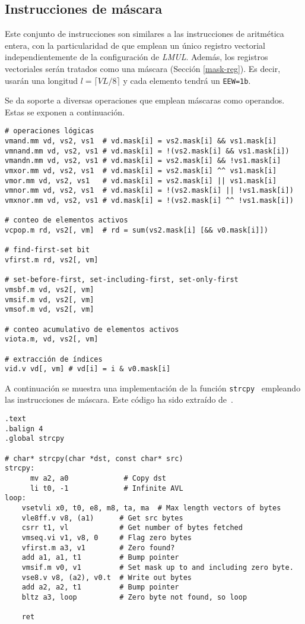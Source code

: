 \subsection{Instrucciones de máscara}{\label{sec:mask-operations}}
Este conjunto de instrucciones son similares a las instrucciones de aritmética
entera, con la particularidad de que emplean un único registro vectorial
independientemente de la configuración de \textit{LMUL}. Además, los registros
vectoriales serán tratados como una máscara (Sección \ref{mask-reg}). Es decir,
usarán una longitud $l = \lceil VL/8 \rceil$ y cada elemento tendrá un
\texttt{EEW=1b}. 

Se da soporte a diversas operaciones que emplean máscaras como operandos. Estas se exponen a continuación. 

\begin{lstlisting}
# operaciones lógicas
vmand.mm vd, vs2, vs1  # vd.mask[i] = vs2.mask[i] && vs1.mask[i] 
vmnand.mm vd, vs2, vs1 # vd.mask[i] = !(vs2.mask[i] && vs1.mask[i])
vmandn.mm vd, vs2, vs1 # vd.mask[i] = vs2.mask[i] && !vs1.mask[i]
vmxor.mm vd, vs2, vs1  # vd.mask[i] = vs2.mask[i] ^^ vs1.mask[i]
vmor.mm vd, vs2, vs1   # vd.mask[i] = vs2.mask[i] || vs1.mask[i]
vmnor.mm vd, vs2, vs1  # vd.mask[i] = !(vs2.mask[i] || !vs1.mask[i])
vmxnor.mm vd, vs2, vs1 # vd.mask[i] = !(vs2.mask[i] ^^ !vs1.mask[i])

# conteo de elementos activos
vcpop.m rd, vs2[, vm]  # rd = sum(vs2.mask[i] [&& v0.mask[i]])

# find-first-set bit 
vfirst.m rd, vs2[, vm]

# set-before-first, set-including-first, set-only-first
vmsbf.m vd, vs2[, vm]
vmsif.m vd, vs2[, vm]
vmsof.m vd, vs2[, vm]

# conteo acumulativo de elementos activos
viota.m, vd, vs2[, vm]

# extracción de índices
vid.v vd[, vm] # vd[i] = i & v0.mask[i]
\end{lstlisting}

A continuación se muestra una implementación de la función \texttt{strcpy}~\cite{strcpy} empleando las instrucciones de máscara. Este código ha sido extraído de~\cite{riscv-isa2024}.

\begin{lstlisting}
.text
.balign 4
.global strcpy

# char* strcpy(char *dst, const char* src)
strcpy:
      mv a2, a0             # Copy dst
      li t0, -1             # Infinite AVL
loop:
    vsetvli x0, t0, e8, m8, ta, ma  # Max length vectors of bytes
    vle8ff.v v8, (a1)      # Get src bytes
    csrr t1, vl            # Get number of bytes fetched
    vmseq.vi v1, v8, 0     # Flag zero bytes
    vfirst.m a3, v1        # Zero found?
    add a1, a1, t1         # Bump pointer
    vmsif.m v0, v1         # Set mask up to and including zero byte.
    vse8.v v8, (a2), v0.t  # Write out bytes
    add a2, a2, t1         # Bump pointer
    bltz a3, loop          # Zero byte not found, so loop

    ret
\end{lstlisting}

